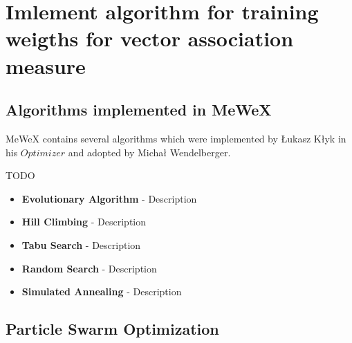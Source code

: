 \chapter{Imlement algorithm for training weigths for vector association measure}

\section{Algorithms implemented in MeWeX}
MeWeX contains several algorithms which were implemented by Łukasz Kłyk in his \(Optimizer\) and adopted by 
Michał Wendelberger.

TODO




\begin{itemize}
    \item \textbf{Evolutionary Algorithm} - Description
 
    \item \textbf{Hill Climbing} - Description
 
    \item \textbf{Tabu Search} - Description
 
    \item \textbf{Random Search} - Description
 
    \item \textbf{Simulated Annealing} - Description 
\end{itemize}

\section{Particle Swarm Optimization}

